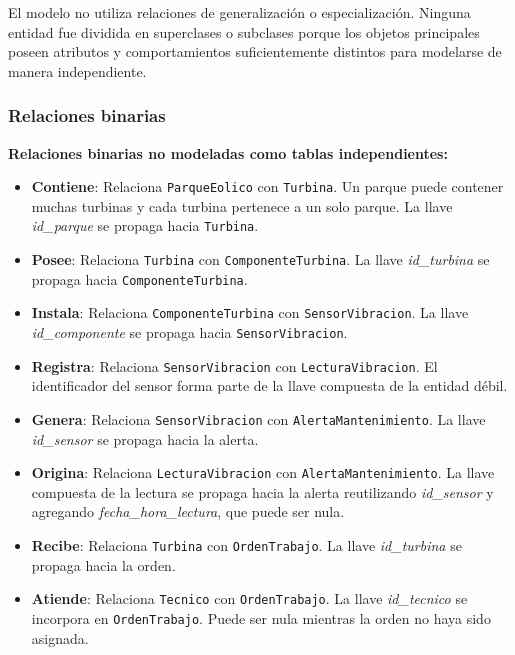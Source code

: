 \documentclass[11pt,a4paper]{article}
\begin{document}
El modelo no utiliza relaciones de generalización o especialización. Ninguna entidad
fue dividida en superclases o subclases porque los objetos principales poseen
atributos y comportamientos suficientemente distintos para modelarse de manera
independiente.

\subsubsection{Relaciones binarias}

\textbf{Relaciones binarias no modeladas como tablas independientes:}

\begin{itemize}
    \item \textbf{Contiene}: Relaciona \texttt{ParqueEolico} con \texttt{Turbina}.
    Un parque puede contener muchas turbinas y cada turbina pertenece a un solo
    parque. La llave \textit{id\_parque} se propaga hacia \texttt{Turbina}.

    \item \textbf{Posee}: Relaciona \texttt{Turbina} con
    \texttt{ComponenteTurbina}. La llave \textit{id\_turbina} se propaga hacia
    \texttt{ComponenteTurbina}.

    \item \textbf{Instala}: Relaciona \texttt{ComponenteTurbina} con
    \texttt{SensorVibracion}. La llave \textit{id\_componente} se propaga hacia
    \texttt{SensorVibracion}.

    \item \textbf{Registra}: Relaciona \texttt{SensorVibracion} con
    \texttt{LecturaVibracion}. El identificador del sensor forma parte de la llave
    compuesta de la entidad débil.

    \item \textbf{Genera}: Relaciona \texttt{SensorVibracion} con
    \texttt{AlertaMantenimiento}. La llave \textit{id\_sensor} se propaga hacia la
    alerta.

    \item \textbf{Origina}: Relaciona \texttt{LecturaVibracion} con
    \texttt{AlertaMantenimiento}. La llave compuesta de la lectura se propaga hacia la
    alerta reutilizando \textit{id\_sensor} y agregando \textit{fecha\_hora\_lectura},
    que puede ser nula.

    \item \textbf{Recibe}: Relaciona \texttt{Turbina} con \texttt{OrdenTrabajo}.
    La llave \textit{id\_turbina} se propaga hacia la orden.

    \item \textbf{Atiende}: Relaciona \texttt{Tecnico} con \texttt{OrdenTrabajo}.
    La llave \textit{id\_tecnico} se incorpora en \texttt{OrdenTrabajo}. Puede ser
    nula mientras la orden no haya sido asignada.
\end{itemize}
\end{document}
